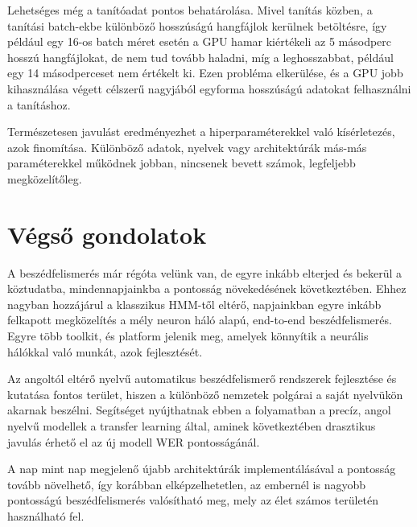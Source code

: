 Lehetséges még a tanítóadat pontos behatárolása. Mivel tanítás közben, a tanítási batch-ekbe különböző hosszúságú hangfájlok kerülnek betöltésre, így például egy 16-os batch méret esetén a GPU hamar kiértékeli az 5 másodperc hosszú hangfájlokat, de nem tud tovább haladni, míg a leghosszabbat, például egy 14 másodperceset nem értékelt ki. Ezen probléma elkerülése, és a GPU jobb kihasználása végett célszerű nagyjából egyforma hosszúságú adatokat felhasználni a tanításhoz.

Természetesen javulást eredményezhet a hiperparaméterekkel való kísérletezés, azok finomítása. Különböző adatok, nyelvek vagy architektúrák más-más paraméterekkel működnek jobban, nincsenek bevett számok, legfeljebb megközelítőleg.

\section{Végső gondolatok}

A beszédfelismerés már régóta velünk van, de egyre inkább elterjed és bekerül a köztudatba, mindennapjainkba a pontosság növekedésének következtében. Ehhez nagyban hozzájárul a klasszikus HMM-től eltérő, napjainkban egyre inkább felkapott megközelítés a mély neuron háló alapú, end-to-end beszédfelismerés. Egyre több toolkit, és platform jelenik meg, amelyek könnyítik a neurális hálókkal való munkát, azok fejlesztését.

Az angoltól eltérő nyelvű automatikus beszédfelismerő rendszerek fejlesztése és kutatása fontos terület, hiszen a különböző nemzetek polgárai a saját nyelvükön akarnak beszélni. Segítséget nyújthatnak ebben a folyamatban a precíz, angol nyelvű modellek a transfer learning által, aminek következtében drasztikus javulás érhető el az új modell WER pontosságánál.

A nap mint nap megjelenő újabb architektúrák implementálásával a pontosság tovább növelhető, így korábban elképzelhetetlen, az embernél is nagyobb pontosságú beszédfelismerés valósítható meg, mely az élet számos területén használható fel.